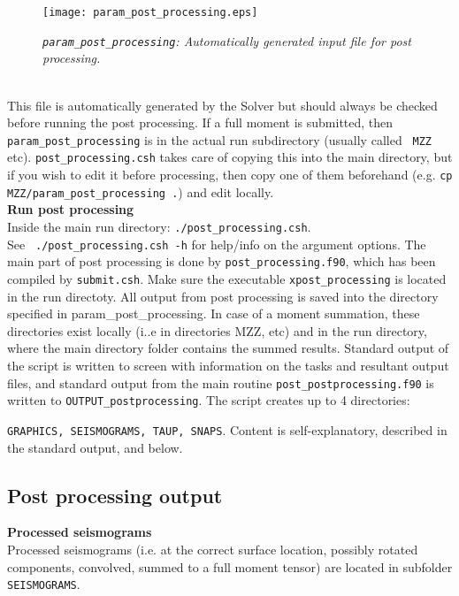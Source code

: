 \documentclass[11pt,letter,fleqn,english,notitlepage]{article}
\begin{document}
\begin{figure*}[htb]
    \begin{center}
        \texttt{[image: param\_post\_processing.eps]}
        \caption{\textit{{\tt param\_post\_processing}: Automatically generated input file for post processing.}}
    \end{center}
\end{figure*}

\\
This file is automatically generated by the Solver but should always be checked
before running the post processing.  If a full moment is submitted, then {\tt
param\_post\_processing} is in the actual run subdirectory (usually called {\tt
MZZ} etc).  {\tt post\_processing.csh} takes care of copying this into the main
directory, but if you wish to edit it before processing, then copy one of them
beforehand (e.g. {\tt cp MZZ/param\_post\_processing .}) and edit locally.\\


\noindent \textbf{Run post processing}\\
Inside the main run directory: {\tt ./post\_processing.csh}.\\ See {\tt
./post\_processing.csh -h} for help/info on the argument options. The main part
of post processing is done by {\tt post\_processing.f90}, which has been
compiled by {\tt submit.csh}. Make sure the executable {\tt xpost\_processing}
is located in the run directoty.  All output from post processing is saved into
the directory specified in param\_post\_processing.  In case of a moment
summation, these directories exist locally (i..e in directories MZZ, etc) and
in the run directory, where the main directory folder contains the summed
results. Standard output of the script is written to screen with information on
the tasks and resultant output files, and standard output from the main routine
{\tt post\_postprocessing.f90} is written to {\tt OUTPUT\_postprocessing}. The
script creates up to 4 directories: 

{\tt GRAPHICS, SEISMOGRAMS, TAUP, SNAPS}. 
Content is self-explanatory, described in the standard output, and below.
\newpage
\subsection{Post processing output}

\noindent \textbf{Processed seismograms}\\
Processed seismograms (i.e. at the correct surface location, possibly rotated
components, convolved, summed to a full moment tensor) are located in subfolder
{\tt SEISMOGRAMS}.\\
\end{document}
